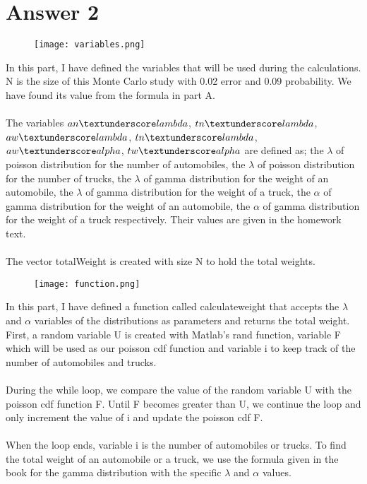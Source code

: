 \documentclass[12pt]{article}
\begin{document}
\section*{Answer 2}
\begin{figure}[H]
\centerline{\texttt{[image: variables.png]}}
\label{fig}
\end{figure}
In this part, I have defined the variables that will be used during the calculations. 
N is the size of this Monte Carlo study with 0.02 error and 0.09 probability. We have found its value from the formula in part A. \\\\
The variables $an \textunderscore lambda$, $tn \textunderscore lambda$, $aw \textunderscore lambda$, $tn \textunderscore lambda$, $aw \textunderscore alpha$, $tw \textunderscore alpha$ are defined as; the $\lambda$ of poisson distribution for the number of automobiles, the $\lambda$ of poisson distribution for the number of trucks, the $\lambda$ of gamma distribution for the weight of an automobile, the $\lambda$ of gamma distribution for the weight of a truck, the $\alpha$ of gamma distribution for the weight of  an automobile, the $\alpha$ of gamma distribution for the weight of  a truck respectively. Their values are given in the homework text.\\\\
The vector totalWeight is created with size N to hold the total weights.
\begin{figure}[H]
\centerline{\texttt{[image: function.png]}}
\label{fig}
\end{figure}
In this part, I have defined a function called calculateweight that accepts the $\lambda$ and $\alpha$ variables of the distributions as parameters and returns the total weight. \\
First, a random variable U is created with Matlab's rand function, variable F which will be used as our poisson cdf function and variable i to keep track of the number of automobiles and trucks. \\\\
During the while loop, we compare the value of the random variable U with the poisson cdf function F. Until F becomes greater than U, we continue the loop and only increment the value of i and update the poisson cdf F.\\\\
When the loop ends, variable i is the number of automobiles or trucks.
To find the total weight of an automobile or a truck, we use the formula given in the book for the gamma distribution with the specific $\lambda$ and $\alpha$ values. 
\end{document}
